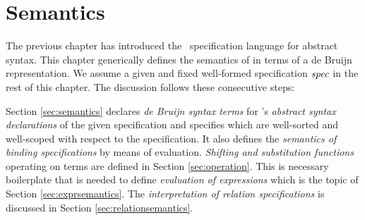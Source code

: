 \chapter{Semantics}\label{ch:knotsemantics}

The previous chapter has introduced the \Knot~specification language for
abstract syntax. This chapter generically defines the semantics of \Knot in
terms of a de Bruijn representation. We assume a given and fixed well-formed
specification $\mathit{spec}$ in the rest of this chapter. The discussion follows these
consecutive steps:

Section \ref{sec:semantics} declares \emph{de Bruijn syntax terms} for \Knot's
\emph{abstract syntax declarations} of the given specification and specifies
which are well-sorted and well-scoped with respect to the specification. It also
defines the \emph{semantics of binding specifications} by means of evaluation.
\emph{Shifting and substitution functions} operating on terms are defined in
Section \ref{sec:operation}. This is necessary boilerplate that is needed to
define \emph{evaluation of expressions} which is the topic of Section
\ref{sec:exprsemantics}. The \emph{interpretation of relation specifications} is
discussed in Section \ref{sec:relationsemantics}.






